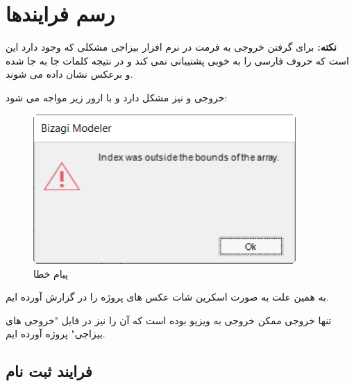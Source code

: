 \documentclass[12pt,a4paper]{article}
\begin{document}
\maketitle
\pagebreak
\tableofcontents
\pagebreak
\listoffigures
\pagebreak
\normalsize	



\pagebreak
\section{رسم فرایندها} \label{section.function}

\textbf{نکته:}
برای گرفتن خروجی به فرمت  در نرم افزار بیزاجی مشکلی که وجود دارد این است که حروف فارسی را به خوبی پشتیبانی نمی کند و در نتیجه کلمات جا به جا شده و برعکس نشان داده می شوند.


خروجی  و نیز مشکل دارد و با ارور زیر مواجه می شود:
	\begin{figure}[h!]
	\begin{center}
		\includegraphics[width=10cm]{images/Error.png}	
	\end{center}
	\caption{پیام خطا}
	\end{figure}


به همین علت به صورت اسکرین شات عکس های پروژه را در گزارش آورده ایم.


تنها خروجی ممکن خروجی به ویزیو بوده است که آن را نیز در فایل  "خروجی های بیزاجی" پروژه آورده ایم.
\pagebreak

\subsection{فرایند ثبت نام} \label{section.function.register}
	
\end{document}

